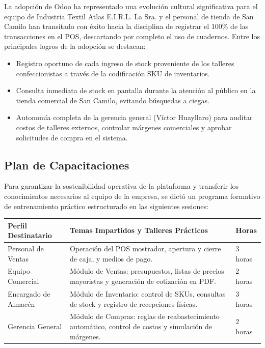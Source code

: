 La adopción de Odoo ha representado una evolución cultural significativa para el equipo de Industria Textil Atlas E.I.R.L. La Sra. y el personal de tienda de San Camilo han transitado con éxito hacia la disciplina de registrar el 100\% de las transacciones en el POS, descartando por completo el uso de cuadernos. Entre los principales logros de la adopción se destacan:
\begin{itemize}
    \item Registro oportuno de cada ingreso de stock proveniente de los talleres confeccionistas a través de la codificación SKU de inventarios.
    \item Consulta inmediata de stock en pantalla durante la atención al público en la tienda comercial de San Camilo, evitando búsquedas a ciegas.
    \item Autonomía completa de la gerencia general (Víctor Huayllaro) para auditar costos de talleres externos, controlar márgenes comerciales y aprobar solicitudes de compra en el sistema.
\end{itemize}

\subsection{Plan de Capacitaciones}

Para garantizar la sostenibilidad operativa de la plataforma y transferir los conocimientos necesarios al equipo de la empresa, se dictó un programa formativo de entrenamiento práctico estructurado en las siguientes sesiones:

\begin{table}[htbp]
\centering
\renewcommand{\arraystretch}{1.25}
\begin{tabular}{|p{3.8cm}|p{7.2cm}|p{1.8cm}|}
\hline
\textbf{Perfil Destinatario} & \textbf{Temas Impartidos y Talleres Prácticos} & \textbf{Horas} \\ \hline
Personal de Ventas & Operación del POS mostrador, apertura y cierre de caja, y medios de pago. & 3 horas \\ \hline
Equipo Comercial & Módulo de Ventas: presupuestos, listas de precios mayoristas y generación de cotización en PDF. & 2 horas \\ \hline
Encargado de Almacén & Módulo de Inventario: control de SKUs, consultas de stock y registro de recepciones físicas. & 3 horas \\ \hline
Gerencia General & Módulo de Compras: reglas de reabastecimiento automático, control de costos y simulación de márgenes. & 2 horas \\ \hline
\end{tabular}
\end{table}
